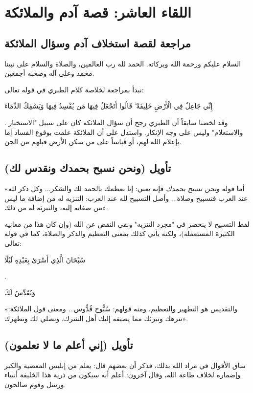 \chapter{اللقاء العاشر: قصة آدم والملائكة}

\section{مراجعة لقصة استخلاف آدم وسؤال الملائكة}
السلام عليكم ورحمة الله وبركاته. الحمد لله رب العالمين، والصلاة والسلام على نبينا محمد وعلى آله وصحبه أجمعين.

نبدأ بمراجعة لخلاصة كلام الطبري في قوله تعالى: \begin{ayah}إِنِّي جَاعِلٌ فِي الْأَرْضِ خَلِيفَةً ۖ قَالُوا أَتَجْعَلُ فِيهَا مَن يُفْسِدُ فِيهَا وَيَسْفِكُ الدِّمَاءَ\end{ayah}.
وقد لخصنا سابقاً أن الطبري رجح أن سؤال الملائكة كان على سبيل "الاستخبار والاستعلام" وليس على وجه الإنكار. واستدل على أن الملائكة علمت بوقوع الفساد إما بإعلام الله لهم، أو قياساً على من سكن الأرض قبلهم من الجن.

\separator

\section{تأويل (ونحن نسبح بحمدك ونقدس لك)}
 «أما قوله \textit{ونحن نسبح بحمدك} فإنه يعني: إنا نعظمك بالحمد لك والشكر... وكل ذكر لله عند العرب فتسبيح وصلاة... وأصل التسبيح لله عند العرب: التنزيه له من إضافة ما ليس من صفاته إليه، والتبرئة له من ذلك».

\begin{fawaid}
لفظ التسبيح لا ينحصر في "مجرد التنزيه" ونفي النقص عن الله (وإن كان هذا من معانيه الكثيرة المستعملة)، ولكنه يأتي كذلك بمعنى التعظيم والذكر والصلاة، كما في قوله تعالى: \begin{ayah}سُبْحَانَ الَّذِي أَسْرَىٰ بِعَبْدِهِ لَيْلًا\end{ayah}.
\end{fawaid}

 \begin{ayah}وَنُقَدِّسُ لَكَ\end{ayah}  «والتقديس هو التطهير والتعظيم، ومنه قولهم: سُبُّوح قُدُّوس... ومعنى قول الملائكة: ننزهك ونبرئك مما يضيفه إليك أهل الشرك، ونصلي لك ونطهرك».

\separator

\section{تأويل (إني أعلم ما لا تعلمون)}
ساق  الأقوال في مراد الله بذلك، فذكر أن بعضهم قال: يعلم من إبليس المعصية والكبر وإضماره لخلاف طاعة الله، وقال آخرون: أعلم أنه سيكون من ذرية هذا الخليفة أنبياء ورسل وقوم صالحون.

